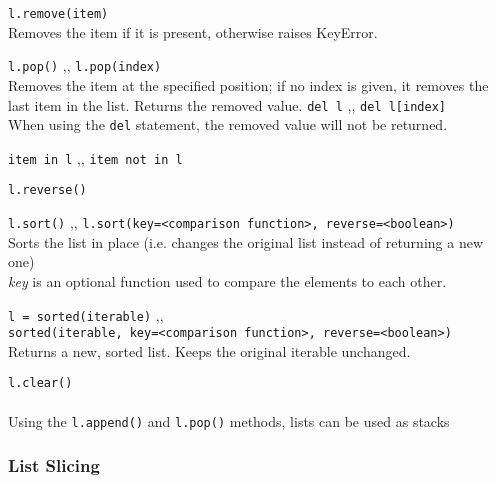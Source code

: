 \begin{itemize}
       \texttt{l.remove(item)} \\
      Removes the item if it is present, otherwise raises KeyError.

      \begin{itemize}
           \texttt{l.pop()} \sep{,}
          \texttt{l.pop(index)} \\
          Removes the item at the specified position; if no index is given, it removes the last item
          in the list. Returns the removed value.
           \texttt{del l} \sep{,}
          \texttt{del l[index]} \\
          When using the \texttt{del} statement, the removed value will not be returned.
      \end{itemize}
      

       \texttt{item in l} \sep{,}
      \texttt{item not in l}

       \texttt{l.reverse()}

       \texttt{l.sort()} \sep{,}
      \texttt{l.sort(key=<comparison function>, reverse=<boolean>)} \\
      Sorts the list in place (i.e. changes the original list instead of returning a new one)\\
      \textit{key} is an optional function used to compare the elements to each other.

       \texttt{l = sorted(iterable)} \sep{,} \\
      \texttt{sorted(iterable, key=<comparison function>, reverse=<boolean>)} \\
      Returns a new, sorted list. Keeps the original iterable unchanged. 

       \texttt{l.clear()}
      \\ \\
      Using the \texttt{l.append()} and \texttt{l.pop()} methods, lists
      can be used as stacks

    \end{itemize}

    \subsubsection{List Slicing} \label{List Slicing}

